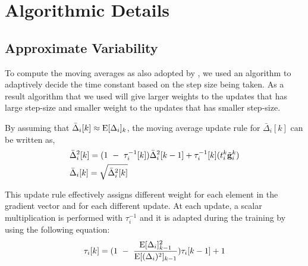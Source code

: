 \documentclass{article}
\begin{document}


\section{Algorithmic Details}

\subsection{Approximate Variability}
To compute the moving averages as also adopted by \cite{schaul2012no}, 
we used an algorithm to adaptively decide the time constant based on the step size being taken. 
As a result algorithm that we used will give larger weights to the updates that has large step-size 
and smaller weight to the updates that has smaller step-size.

By assuming that $\bar{\Delta}_i[k]\approx\mathrm{E}[\Delta_i]_k$, 
the moving average update rule for $\bar{\Delta}_i[k]$ can be written as,
\begin{align}
    \label{eqn:approx_var}
    & \bar{\Delta}_i^2[k] = (1~-~\tau_i^{-1}[k])\bar{\Delta}_i^2[k-1] + \tau_i^{-1}[k](t_i^k
                                                                                   \tilde{\mathbf{g}}_i^k)
    \\
    & \bar{\Delta}_i[k] = \sqrt{\bar{\Delta}_i^2[k]}
\end{align}

This update rule effectively assigns different weight for each element in the gradient vector and for each different update.
At each update, a scalar multiplication is performed with $\tau_i^{-1}$ and it is adapted during the training by using the following equation:
\begin{equation}
    \label{eqn:approx_var_update}
    \tau_i[k] = (1~-~\frac{\mathrm{E}[\Delta_i]_{k-1}^2}{\mathrm{E}[(\Delta_i)^2]_{k-1}})\tau_i[k-1] + 1
\end{equation}

\end{document}

